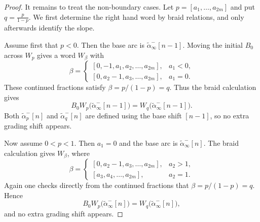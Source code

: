 \documentclass[11pt,a4paper,reqno]{amsart}%
\theoremstyle{plain}
\theoremstyle{definition}
\numberwithin{equation}{section}
\numberwithin{equation}{section}
\begin{document}
\begin{proof}
It remains to treat the non-boundary cases. Let
$p=[a_1,\ldots,a_{2m}]$ and put $q=\frac{p}{1-p}$. We first determine the
right hand word by braid relations, and only afterwards identify the slope.

Assume first that $p<0$. Then the base arc is
$\widetilde{\alpha}_\infty^-[n-1]$. Moving the initial $B_0$ across $W_p$ gives
a word $W_\beta$ with
\[
\beta=
\begin{cases}
[0,-1,a_1,a_2,\ldots,a_{2m}],& a_1<0,\\[2pt]
[0,a_2-1,a_3,\ldots,a_{2m}],& a_1=0.
\end{cases}
\]
These continued fractions satisfy $\beta=p/(1-p)=q$. Thus the braid calculation
gives
\[
B_0W_p\bigl(\widetilde{\alpha}_\infty^-[n-1]\bigr)
=W_q\bigl(\widetilde{\alpha}_\infty^-[n-1]\bigr).
\]
Both $\widetilde{\alpha}_p^-[n]$ and $\widetilde{\alpha}_q^-[n]$ are defined
using the base shift $[n-1]$, so no extra grading shift appears.

Now assume $0<p< 1$. Then $a_1=0$ and the base arc is
$\widetilde{\alpha}_\infty^-[n]$. The braid calculation gives $W_\beta$, where
\[
\beta=
\begin{cases}
[0,a_2-1,a_3,\ldots,a_{2m}],& a_2>1,\\[2pt]
[a_3,a_4,\ldots,a_{2m}],& a_2=1.
\end{cases}
\]
Again one checks directly from the continued fractions that
$\beta=p/(1-p)=q$. Hence
\[
B_0W_p\bigl(\widetilde{\alpha}_\infty^-[n]\bigr)
=W_q\bigl(\widetilde{\alpha}_\infty^-[n]\bigr),
\]
and no extra grading shift appears.


\end{proof}
\end{document}
